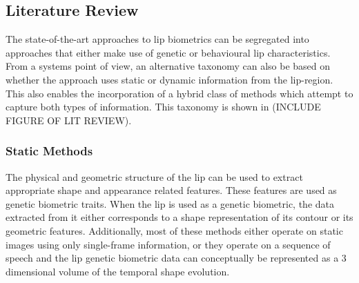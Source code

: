 \documentclass[a4paper, 10pt, conference]{ieeeconf}      %
\begin{document}
\subsection{Literature Review}
\label{LiteratureReview}
The state-of-the-art approaches to lip biometrics can be segregated into approaches that either make use of genetic or behavioural lip characteristics. From a systems point of view, an alternative taxonomy can also be based on whether the approach uses static or dynamic information from the lip-region. This also enables the incorporation of a hybrid class of methods which attempt to capture both types of information. This taxonomy is shown in (INCLUDE FIGURE OF LIT REVIEW).
\subsubsection{Static Methods}
The physical and geometric structure of the lip can be used to extract appropriate shape and appearance related features. These features are used as genetic biometric traits. When the lip is used as a genetic biometric, the data extracted from it either corresponds to a shape representation of its contour or its geometric features. Additionally, most of these methods either operate on static images using only single-frame information, or they operate on a sequence of speech and the lip genetic biometric data can conceptually be represented as a 3 dimensional volume of the temporal shape evolution. 
\end{document}
